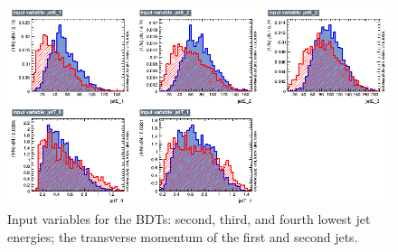\begin{figure}[h]
	\centering
	\includegraphics[width=1.0\textwidth]{../Pictures/Analysis/BDTs/variables_id_c5.png}
	\caption{Input variables for the BDTs: second, third, and fourth lowest jet energies; the transverse momentum of the first and second jets.}
	\label{figure:analysis/results/tmva-inputs-5}
\end{figure}

